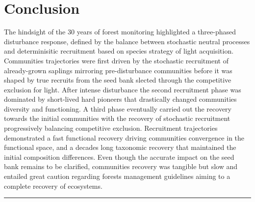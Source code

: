\documentclass[fleqn,10pt]{ArtEcoFoG} %
\begin{document}
\section{Conclusion}\label{conclusion}

The hindsight of the 30 years of forest monitoring highlighted a
three-phased disturbance response, defined by the balance between
stochastic neutral processes and determinisitic recruitment based on
species strategy of light acquisition. Communities trajectories were
first driven by the stochastic recruitment of already-grown saplings
mirroring pre-disturbance communities before it was shaped by true
recruits from the seed bank slected through the competitive exclusion
for light. After intense disturbance the second recruitment phase was
dominated by short-lived hard pioneers that drastically changed
communities diversity and functioning. A third phase eventually carried
out the recovery towards the initial communities with the recovery of
stochastic recruitment progressively balancing competitive exclusion.
Recruitment trajectories demonstrated a fast functional recovery driving
communities convergence in the functional space, and a decades long
taxonomic recovery that maintained the initial composition differences.
Even though the accurate impact on the seed bank remains to be
clarified, communities recovery was tangible but slow and entailed great
caution regarding forests management guidelines aiming to a complete
recovery of ecosystems.

\begin{center}\rule{0.5\linewidth}{\linethickness}\end{center}



\makeatletter

\makeatother


\end{document}
